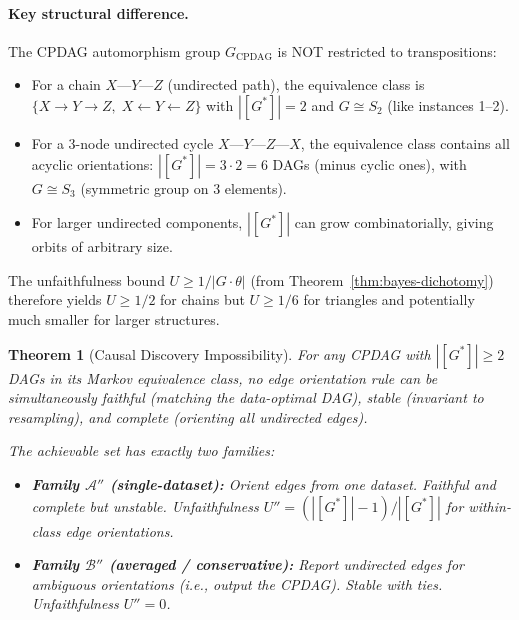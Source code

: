 \documentclass{article}
\newtheorem{theorem}{Theorem}
\begin{document}
\paragraph{Key structural difference.}
The CPDAG automorphism group $G_{\text{CPDAG}}$ is NOT restricted to
transpositions:
\begin{itemize}
    \item For a chain $X \text{---} Y \text{---} Z$ (undirected path),
      the equivalence class is $\{X \to Y \to Z,\; X \leftarrow Y \leftarrow Z\}$
      with $|[G^*]| = 2$ and $G \cong S_2$ (like instances 1--2).
    \item For a 3-node undirected cycle $X \text{---} Y \text{---} Z \text{---} X$,
      the equivalence class contains all acyclic orientations:
      $|[G^*]| = 3\cdot 2 = 6$ DAGs (minus cyclic ones), with
      $G \cong S_3$ (symmetric group on 3 elements).
    \item For larger undirected components, $|[G^*]|$ can grow
      combinatorially, giving orbits of arbitrary size.
\end{itemize}
The unfaithfulness bound $U \geq 1/|G \cdot \theta|$ (from
Theorem~\ref{thm:bayes-dichotomy}) therefore yields
$U \geq 1/2$ for chains but $U \geq 1/6$ for triangles and
potentially much smaller for larger structures.

\begin{theorem}[Causal Discovery Impossibility]
\label{thm:causal-discovery}
For any CPDAG with $|[G^*]| \geq 2$ DAGs in its Markov equivalence
class, no edge orientation rule can be simultaneously faithful
(matching the data-optimal DAG), stable (invariant to resampling),
and complete (orienting all undirected edges).

The achievable set has exactly two families:
\begin{itemize}
    \item \textbf{Family $\mathcal{A}''$ (single-dataset):}
      Orient edges from one dataset. Faithful and complete but unstable.
      Unfaithfulness $U'' = (|[G^*]|-1)/|[G^*]|$ for within-class
      edge orientations.
    \item \textbf{Family $\mathcal{B}''$ (averaged / conservative):}
      Report undirected edges for ambiguous orientations (i.e., output
      the CPDAG). Stable with ties. Unfaithfulness $U'' = 0$.
\end{itemize}
\end{theorem}
\end{document}
